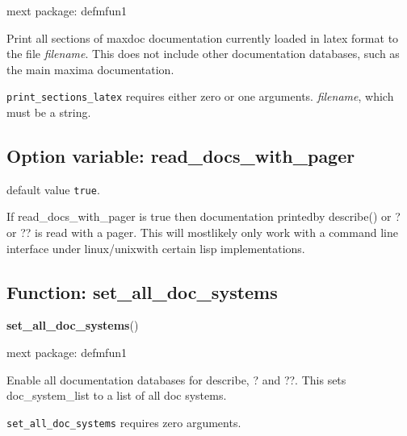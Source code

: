 \documentclass[]{article}
\begin{document}
\noindent mext package: defmfun1



\vspace{5 pt}
Print all sections of maxdoc documentation currently loaded in latex format to the file {\it filename}. This does not include other documentation databases, such as the main maxima documentation. 

\vspace{5 pt}

   {\tt print\_sections\_latex} requires either zero or one arguments.
 {\it filename}, which must be a string.


\vspace{5 pt}


\subsection{Option variable: read\_docs\_with\_pager\label{sec:read_docs_with_pager}}
\hypertarget{read_docs_with_pager}{}



\vspace{5 pt}
  default value \verb#true#.

If read\_docs\_with\_pager is true then documentation printedby describe() or ? or ?? is read with a pager. This will mostlikely only work with a command line interface under linux/unixwith certain lisp implementations. 

\vspace{5 pt}


\subsection{Function: set\_all\_doc\_systems\label{sec:set_all_doc_systems}}
\hypertarget{set_all_doc_systems}{}
{\bf set\_all\_doc\_systems}()


\noindent mext package: defmfun1



\vspace{5 pt}
Enable all documentation databases for describe, ? and ??. This sets doc\_system\_list to a list of all doc systems. 

\vspace{5 pt}

   {\tt set\_all\_doc\_systems} requires zero arguments.
\end{document}
